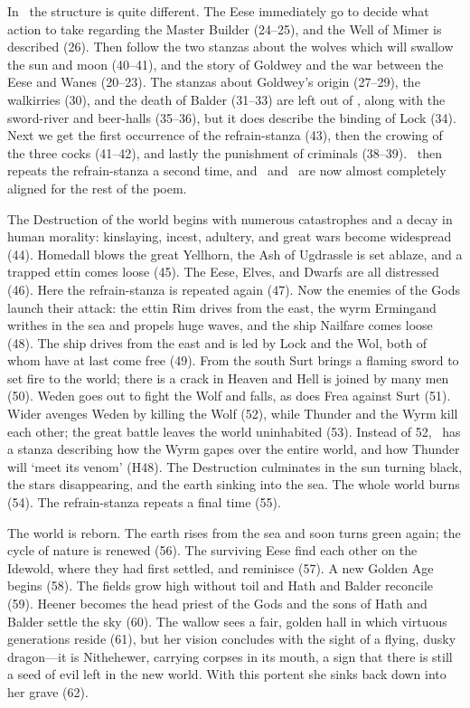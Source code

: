 In \Hauksbok\ the structure is quite different.  The Eese immediately go to decide what action to take regarding the Master Builder (24--25), and the Well of Mimer is described (26).  Then follow the two stanzas about the wolves which will swallow the sun and moon (40--41), and the story of Goldwey and the war between the Eese and Wanes (20--23).  The stanzas about Goldwey’s origin (27--29), the walkirries (30), and the death of Balder (31--33) are left out of \Hauksbok, along with the sword-river and beer-halls (35--36), but it does describe the binding of Lock (34).  Next we get the first occurrence of the refrain-stanza (43), then the crowing of the three cocks (41--42), and lastly the punishment of criminals (38--39).  \Hauksbok\ then repeats the refrain-stanza a second time, and \Regius\ and \Hauksbok\ are now almost completely aligned for the rest of the poem.

The Destruction of the world begins with numerous catastrophes and a decay in human morality: kinslaying, incest, adultery, and great wars become widespread (44).  Homedall blows the great Yellhorn, the Ash of Ugdrassle is set ablaze, and a trapped ettin comes loose (45).  The Eese, Elves, and Dwarfs are all distressed (46).  Here the refrain-stanza is repeated again (47).  Now the enemies of the Gods launch their attack: the ettin Rim drives from the east, the wyrm Ermingand writhes in the sea and propels huge waves, and the ship Nailfare comes loose (48).  The ship drives from the east and is led by Lock and the Wol, both of whom have at last come free (49).  From the south Surt brings a flaming sword to set fire to the world; there is a crack in Heaven and Hell is joined by many men (50).  Weden goes out to fight the Wolf and falls, as does Frea against Surt (51).  Wider avenges Weden by killing the Wolf (52), while Thunder and the Wyrm kill each other; the great battle leaves the world uninhabited (53).  Instead of 52, \Hauksbok\ has a stanza describing how the Wyrm gapes over the entire world, and how Thunder will ‘meet its venom’ (H48).  The Destruction culminates in the sun turning black, the stars disappearing, and the earth sinking into the sea.  The whole world burns (54).  The refrain-stanza repeats a final time (55).

The world is reborn.  The earth rises from the sea and soon turns green again; the cycle of nature is renewed (56).  The surviving Eese find each other on the Idewold, where they had first settled, and reminisce (57).  A new Golden Age begins (58).  The fields grow high without toil and Hath and Balder reconcile (59).  Heener becomes the head priest of the Gods and the sons of Hath and Balder settle the sky (60).  The wallow sees a fair, golden hall in which virtuous generations reside (61), but her vision concludes with the sight of a flying, dusky dragon---it is Nithehewer, carrying corpses in its mouth, a sign that there is still a seed of evil left in the new world.  With this portent she sinks back down into her grave (62).

